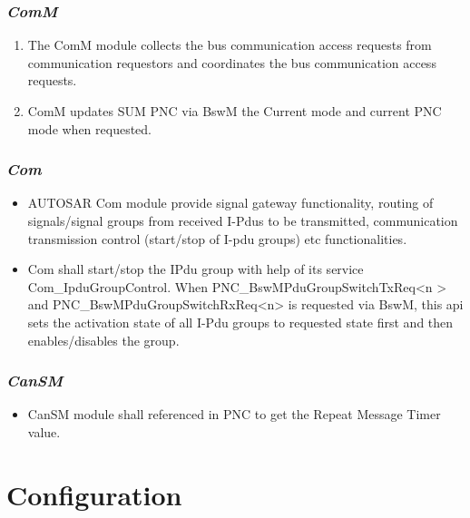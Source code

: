 \subsubsection{\textit{ComM}}

\begin{enumerate}
	\item The ComM module collects the bus communication access requests from communication requestors and coordinates the bus communication access requests.
	\item ComM updates SUM PNC via BswM the Current mode and current PNC mode when requested.
\end{enumerate}

\subsubsection{\textit{Com}}

\begin{itemize}
	\item AUTOSAR Com module provide signal gateway functionality, routing of signals/signal groups from received I-Pdus to be transmitted, communication transmission control (start/stop of I-pdu groups) etc functionalities.
	\item Com shall start/stop the IPdu group with help of its service Com\_IpduGroupControl. When PNC\_BswMPduGroupSwitchTxReq<n > and PNC\_BswMPduGroupSwitchRxReq<n> is requested via BswM, this api sets the activation state of all I-Pdu groups to requested state first and then enables/disables the group. 
\end{itemize}

\subsubsection{\textit{CanSM}}

\begin{itemize}
	\item CanSM module shall referenced in PNC to get the Repeat Message Timer value.
\end{itemize}

     

\section{Configuration}

